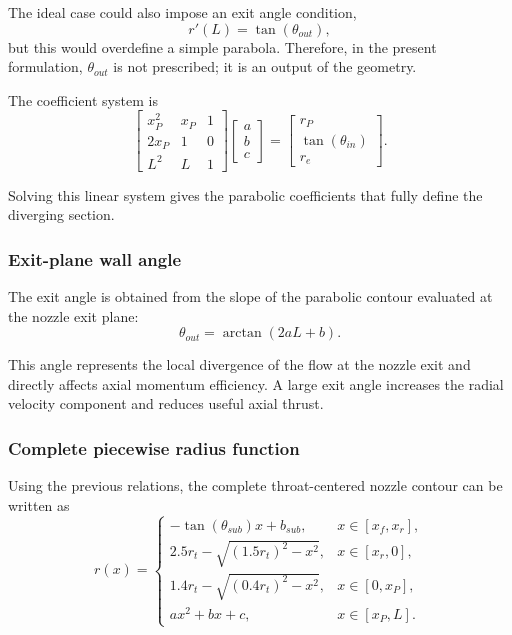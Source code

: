 \documentclass[11pt,a4paper]{article}
\begin{document}
The ideal case could also impose an exit angle condition,
\begin{equation}
r'(L)=\tan(\theta_{out}),
\end{equation}
but this would overdefine a simple parabola. Therefore, in the present formulation, $\theta_{out}$ is not prescribed; it is an output of the geometry.

The coefficient system is
\begin{equation}
\begin{bmatrix}
x_P^2 & x_P & 1\\
2x_P & 1 & 0\\
L^2 & L & 1
\end{bmatrix}
\begin{bmatrix}
a\\b\\c
\end{bmatrix}
=
\begin{bmatrix}
r_P\\ \tan(\theta_{in})\\ r_e
\end{bmatrix}.
\label{eq:parabola_matrix}
\end{equation}

Solving this linear system gives the parabolic coefficients that fully define the diverging section.

\subsubsection{Exit-plane wall angle}

The exit angle is obtained from the slope of the parabolic contour evaluated at the nozzle exit plane:
\begin{equation}
\theta_{out}=\arctan\left(2aL+b\right).
\label{eq:theta_out}
\end{equation}

This angle represents the local divergence of the flow at the nozzle exit and directly affects axial momentum efficiency. A large exit angle increases the radial velocity component and reduces useful axial thrust.

\subsubsection{Complete piecewise radius function}

Using the previous relations, the complete throat-centered nozzle contour can be written as
\begin{equation}
r(x)=
\begin{cases}
-\tan(\theta_{sub})x+b_{sub},
& x\in[x_f,x_r],\\[6pt]
2.5r_t-\sqrt{(1.5r_t)^2-x^2},
& x\in[x_r,0],\\[6pt]
1.4r_t-\sqrt{(0.4r_t)^2-x^2},
& x\in[0,x_P],\\[6pt]
ax^2+bx+c,
& x\in[x_P,L].
\end{cases}
\label{eq:piecewise_nozzle}
\end{equation}
\end{document}
